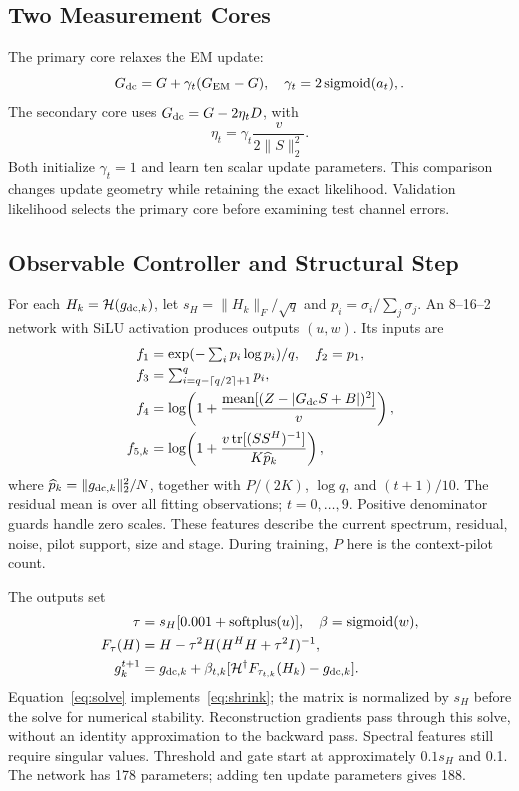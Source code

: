 \documentclass[10pt,journal,letterpaper]{IEEEtran}
\newcommand{\HH}{\mathcal{H}}
\DeclareMathOperator{\tr}{tr}
\DeclareMathOperator{\sigmoid}{sigmoid}
\DeclareMathOperator{\softplus}{softplus}
\begin{document}
\subsection{Two Measurement Cores}
The primary core relaxes the EM update:
\begin{equation}
 G_{\rm dc}=G+\gamma_t(G_{\rm EM}-G),\quad
 \gamma_t=2\sigmoid(a_t),.
\end{equation}
The secondary core uses $G_{\rm dc}=G-2\eta_tD$, with
\begin{equation}
 \eta_t=\gamma_t\frac{v}{2\|S\|_2^2}.
\end{equation}
Both initialize $\gamma_t=1$ and learn ten scalar update parameters. This comparison changes update geometry while retaining the exact likelihood. Validation likelihood selects the primary core before examining test channel errors.

\subsection{Observable Controller and Structural Step}
For each $H_k=\HH(g_{{\rm dc},k})$, let $s_H=\|H_k\|_F/\sqrt q$ and $p_i=\sigma_i/\sum_j\sigma_j$. An 8--16--2 network with SiLU activation produces outputs $(u,w)$. Its inputs are
\begin{align}
 f_1&=\exp(-\textstyle\sum_i p_i\log p_i)/q,\quad f_2=p_1,\nonumber\\
 f_3&=\textstyle\sum_{i=q-\lceil q/2\rceil+1}^q p_i,\label{eq:features}\\
 f_4&=\log\!\left(1+\frac{\operatorname{mean}[(Z-|G_{\rm dc}S+B|)^2]}{v}\right),\nonumber\\
 f_{5,k}&=\log\!\left(1+\frac{v\tr[(SS^H)^{-1}]}{K\widehat p_k}\right),\nonumber
\end{align}
where $\widehat p_k=\|g_{{\rm dc},k}\|_2^2/N$, together with $P/(2K)$, $\log q$, and $(t+1)/10$. The residual mean is over all fitting observations; $t=0,\ldots,9$. Positive denominator guards handle zero scales. These features describe the current spectrum, residual, noise, pilot support, size and stage. During training, $P$ here is the context-pilot count.

The outputs set
\begin{align}
 \tau&=s_H[0.001+\softplus(u)],\quad \beta=\sigmoid(w),\\
 F_\tau(H)&=H-\tau^2H(H^HH+\tau^2I)^{-1},\label{eq:solve}\\
 g_k^{t+1}&=g_{{\rm dc},k}+\beta_{t,k}
       [\HH^\dagger F_{\tau_{t,k}}(H_k)-g_{{\rm dc},k}].
\end{align}
Equation~\eqref{eq:solve} implements~\eqref{eq:shrink}; the matrix is normalized by $s_H$ before the solve for numerical stability. Reconstruction gradients pass through this solve, without an identity approximation to the backward pass. Spectral features still require singular values. Threshold and gate start at approximately $0.1s_H$ and 0.1. The network has 178 parameters; adding ten update parameters gives 188.
\end{document}
